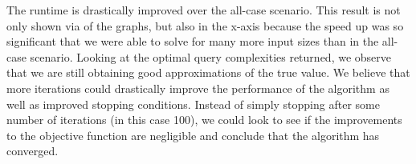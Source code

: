 The runtime is drastically improved over the all-case scenario. 
This result is not only shown via  of the graphs, 
but also in the x-axis because the speed up was so 
significant that we were able to solve for many more 
input sizes than in the all-case scenario. 
Looking at the optimal query complexities returned, 
we observe that we are still obtaining good 
approximations of the true value. 
We believe that more iterations could drastically 
improve the performance of the algorithm as well as 
improved stopping conditions. Instead of simply stopping 
after some number of iterations (in this case 100), 
we could look to see if the improvements to the objective 
function are negligible and conclude that the algorithm has converged.
